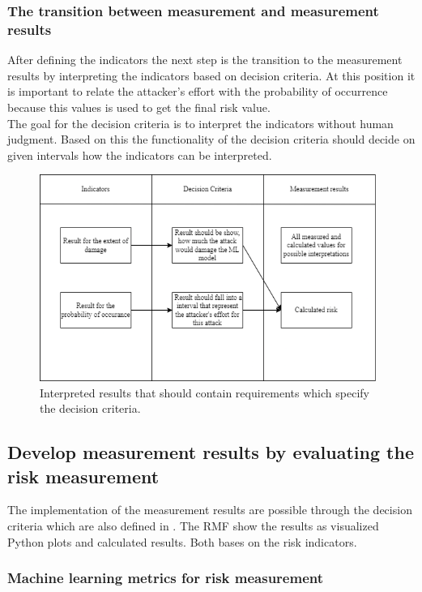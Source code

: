 \subsubsection*{The transition between measurement and measurement results}

After defining the indicators the next step is the transition to the measurement results by interpreting the indicators based on decision criteria. At this position it is important to relate the attacker's effort with the probability of occurrence because this values is used to get the final risk value. \\
The goal for the decision criteria is to interpret the indicators without human judgment. Based on this the functionality of the decision criteria should decide on given intervals how the indicators can be interpreted.

\begin{figure}[ht!]
  \centering
  \includegraphics[width=11cm]{pictures/measurement_results_concept.png}
  \caption{Interpreted results that should contain requirements which specify the decision criteria.}
  \label{fig:measurement_results_concept}
\end{figure}

\subsection{Develop measurement results by evaluating the risk measurement}
\label{sec:measurement_results}

The implementation of the measurement results are possible through the decision criteria which are also defined in \cite{ISO_27004_2009}. The RMF show the results as visualized Python plots and calculated results. Both bases on the risk indicators.

\subsubsection*{Machine learning metrics for risk measurement}


